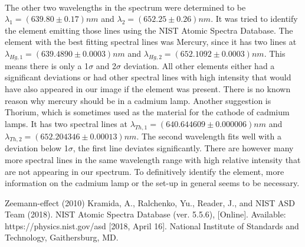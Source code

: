 \documentclass[12pt]{article}
\begin{document}
\\The other two wavelengths in the spectrum were determined to be $\lambda_1=(639.80\pm0.17)nm$ and $\lambda_2=(652.25\pm0.26)nm$. It was tried to identify the element emitting those lines using the NIST Atomic Spectra Database. The element with the best fitting spectral lines was Mercury, since it has two lines at $\lambda_{Hg,1}=(639.4890\pm0.0003)nm$ and $\lambda_{Hg,2}=(652.1092\pm0.0003)nm$. This means there is only a 1$\sigma$ and 2$\sigma$ deviation. All other elements either had a significant deviations or had other spectral lines with high intensity that would have also appeared in our image if the element was present. There is no known reason why mercury should be in a cadmium lamp. Another suggestion is Thorium, which is sometimes used as the material for the cathode of cadmium lamps. It has two spectral lines at $\lambda_{Th,1}=(640.644609\pm0.000006)nm$ and $\lambda_{Th,2}=(652.204346\pm0.00013)nm$. The second wavelength fits well with a deviation below 1$\sigma$, the first line deviates significantly. There are however many more spectral lines in the same wavelength range with high relative intensity that are not appearing in our spectrum. To definitively identify the element, more information on the cadmium lamp or the set-up in general seems to be necessary. 



\newpage
\begin{thebibliography}{00}   %

 Zeemann-effect (2010)
 Kramida, A., Ralchenko, Yu., Reader, J., and NIST ASD Team (2018). NIST Atomic Spectra Database (ver. 5.5.6), [Online]. Available: https://physics.nist.gov/asd [2018, April 16]. National Institute of Standards and Technology, Gaithersburg, MD. 

\end{thebibliography}
\end{document}
